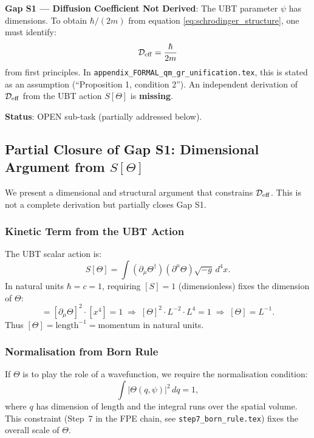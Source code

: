 \documentclass[12pt]{article}
\theoremstyle{definition}
\theoremstyle{remark}
\begin{document}
\begin{gapbox}
\textbf{Gap S1 — Diffusion Coefficient Not Derived}:
The UBT parameter $\psi$ has dimensions.  To obtain $\hbar/(2m)$ from equation
\eqref{eq:schrodinger_structure}, one must identify:
\[
  \mathcal{D}_{\rm eff} = \frac{\hbar}{2m}
\]
from first principles.  In \texttt{appendix\_FORMAL\_qm\_gr\_unification.tex}, this is stated
as an assumption (``Proposition 1, condition 2'').  An independent derivation of
$\mathcal{D}_{\rm eff}$ from the UBT action $S[\Theta]$ is \textbf{missing}.

\textbf{Status}: OPEN sub-task (partially addressed below).
\end{gapbox}

\subsection{Partial Closure of Gap S1: Dimensional Argument from $S[\Theta]$}
\label{subsec:gap_s1_partial}

We present a dimensional and structural argument that constrains $\mathcal{D}_{\rm eff}$.
This is not a complete derivation but partially closes Gap S1.

\subsubsection{Kinetic Term from the UBT Action}

The UBT scalar action is:
\begin{equation}
  S[\Theta] = \int (\partial_\mu \Theta^\dagger)(\partial^\mu \Theta)\sqrt{-g}\, d^4x.
  \label{eq:ubt_action}
\end{equation}
In natural units $\hbar = c = 1$, requiring $[S] = 1$ (dimensionless) fixes the
dimension of $\Theta$:
\begin{equation}
  [S] = [\partial_\mu \Theta]^2 \cdot [x^4] = 1
  \;\Longrightarrow\;
  [\Theta]^2 \cdot L^{-2} \cdot L^4 = 1
  \;\Longrightarrow\;
  [\Theta] = L^{-1}.
\end{equation}
Thus $[\Theta] = \text{length}^{-1} = \text{momentum}$ in natural units.

\subsubsection{Normalisation from Born Rule}

If $\Theta$ is to play the role of a wavefunction, we require the normalisation
condition:
\begin{equation}
  \int |\Theta(q, \psi)|^2\, dq = 1,
  \label{eq:normalisation}
\end{equation}
where $q$ has dimension of length and the integral runs over the spatial volume.
This constraint (Step~7 in the FPE chain, see \texttt{step7\_born\_rule.tex})
fixes the overall scale of $\Theta$.
\end{document}
